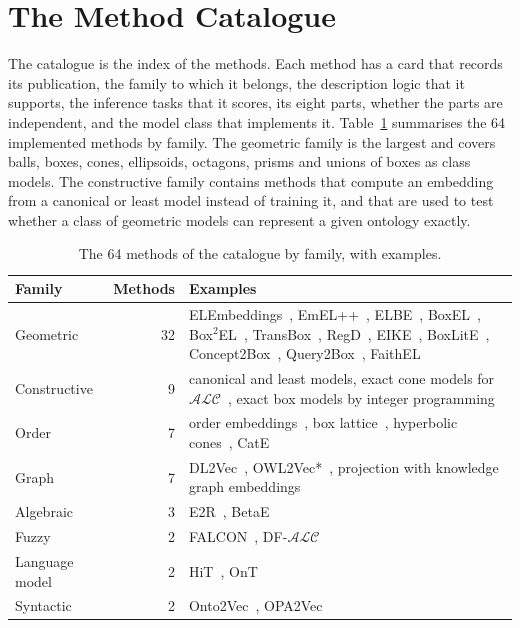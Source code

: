 \documentclass[runningheads]{llncs}
\newcommand{\ALC}{\ensuremath{\mathcal{ALC}}}
\begin{document}
\section{The Method Catalogue}

The catalogue is the index of the methods. Each method has a card that records its
publication, the family to which it belongs, the description logic that it supports,
the inference tasks that it scores, its eight parts, whether the parts are independent,
and the model class that implements it. Table~\ref{tab:catalogue} summarises the 64
implemented methods by family. The geometric family is the largest and covers balls,
boxes, cones, ellipsoids, octagons, prisms and unions of boxes as class models. The
constructive family contains methods that compute an embedding from a canonical or least
model instead of training it, and that are used to test whether a class of geometric
models can represent a given ontology exactly.

\begin{table}[t]
\caption{The 64 methods of the catalogue by family, with examples.}\label{tab:catalogue}
\centering\footnotesize\setlength{\tabcolsep}{4pt}
\begin{tabular}{@{}lrp{8.0cm}@{}}
\toprule
Family & Methods & Examples \\
\midrule
Geometric & 32 & ELEmbeddings~\cite{kulmanov2019}, EmEL++~\cite{mondal2021},
  ELBE~\cite{peng2020}, BoxEL~\cite{xiong2022}, Box$^2$EL~\cite{jackermeier2024},
  TransBox~\cite{yang2025}, RegD~\cite{yang2025regd}, EIKE~\cite{wang2024eike},
  BoxLitE~\cite{lourenco2026},
  Concept2Box~\cite{huang2023}, Query2Box~\cite{ren2020q2b}, FaithEL~\cite{lacerda2024faithel} \\
Constructive & 9 & canonical and least models, exact cone models for \ALC{}~\cite{ozcep2023},
  exact box models by integer programming \\
Order & 7 & order embeddings~\cite{vendrov2016}, box lattice~\cite{vilnis2018},
  hyperbolic cones~\cite{ganea2018}, CatE~\cite{zhapa2023} \\
Graph & 7 & DL2Vec~\cite{chen2020}, OWL2Vec*~\cite{chen2020b}, projection with
  knowledge graph embeddings \\
Algebraic & 3 & E2R~\cite{garg2019}, BetaE~\cite{ren2020betae} \\
Fuzzy & 2 & FALCON~\cite{falcon2022}, DF-\ALC~\cite{wu2022} \\
Language model & 2 & HiT~\cite{he2024hit}, OnT~\cite{yang2025ont} \\
Syntactic & 2 & Onto2Vec~\cite{smaili2018}, OPA2Vec~\cite{smaili2019} \\
\bottomrule
\end{tabular}
\end{table}
\end{document}

